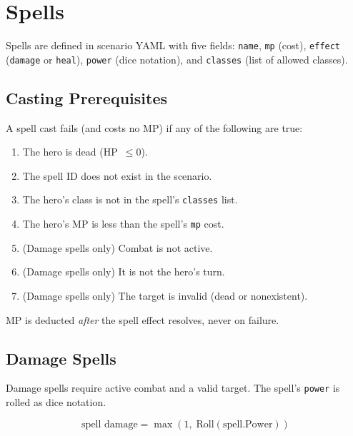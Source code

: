 \documentclass[a4paper,10pt]{article}
\newcommand{\field}[1]{\texttt{#1}}
\begin{document}
\section{Spells}
\label{sec:spells}

Spells are defined in scenario YAML with five fields: \field{name},
\field{mp} (cost), \field{effect} (\texttt{damage} or \texttt{heal}),
\field{power} (dice notation), and \field{classes} (list of allowed classes).

\subsection{Casting Prerequisites}

A spell cast fails (and costs no MP) if any of the following are true:

\begin{enumerate}[nosep]
  \item The hero is dead (HP~$\leq 0$).
  \item The spell ID does not exist in the scenario.
  \item The hero's class is not in the spell's \field{classes} list.
  \item The hero's MP is less than the spell's \field{mp} cost.
  \item (Damage spells only) Combat is not active.
  \item (Damage spells only) It is not the hero's turn.
  \item (Damage spells only) The target is invalid (dead or nonexistent).
\end{enumerate}

MP is deducted \emph{after} the spell effect resolves, never on failure.

\subsection{Damage Spells}

Damage spells require active combat and a valid target. The spell's
\field{power} is rolled as dice notation.

\[
  \text{spell damage} = \max(1,\; \text{Roll}(\text{spell.Power}))
\]
\end{document}
